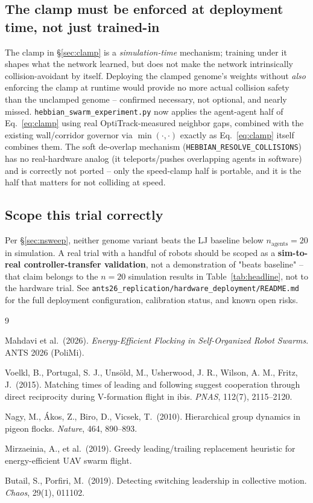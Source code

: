 \documentclass[11pt]{article}
\begin{document}
\subsection{The clamp must be enforced at deployment time, not just trained-in}
\label{sec:clamp-deploy}
The clamp in \S\ref{sec:clamp} is a \emph{simulation-time} mechanism; training under it shapes
what the network learned, but does not make the network intrinsically collision-avoidant by
itself. Deploying the clamped genome's weights without \emph{also} enforcing the clamp at
runtime would provide no more actual collision safety than the unclamped genome -- confirmed
necessary, not optional, and nearly missed. \texttt{hebbian\_swarm\_experiment.py} now applies
the agent-agent half of Eq.~\ref{eq:clamp} using real OptiTrack-measured neighbor gaps,
combined with the existing wall/corridor governor via $\min(\cdot,\cdot)$ exactly as
Eq.~\ref{eq:clamp} itself combines them. The soft de-overlap mechanism
(\texttt{HEBBIAN\_RESOLVE\_COLLISIONS}) has no real-hardware analog (it teleports/pushes
overlapping agents in software) and is correctly not ported -- only the speed-clamp half is
portable, and it is the half that matters for not colliding at speed.

\subsection{Scope this trial correctly}
Per \S\ref{sec:nsweep}, neither genome variant beats the LJ baseline below $n_{\text{agents}}=20$
in simulation. A real trial with a handful of robots should be scoped as a
\textbf{sim-to-real controller-transfer validation}, not a demonstration of "beats baseline"
-- that claim belongs to the $n{=}20$ simulation results in Table~\ref{tab:headline}, not to
the hardware trial. See \texttt{ants26\_replication/hardware\_deployment/README.md} for the
full deployment configuration, calibration status, and known open risks.

\clearpage
\begin{thebibliography}{9}

Mahdavi et al.\ (2026). \emph{Energy-Efficient Flocking in Self-Organized Robot Swarms}. ANTS
2026 (PoliMi).

Voelkl, B., Portugal, S. J., Unsöld, M., Usherwood, J. R., Wilson, A. M., Fritz, J.\ (2015).
Matching times of leading and following suggest cooperation through direct reciprocity during
V-formation flight in ibis. \emph{PNAS}, 112(7), 2115--2120.

Nagy, M., Ákos, Z., Biro, D., Vicsek, T.\ (2010). Hierarchical group dynamics in pigeon flocks.
\emph{Nature}, 464, 890--893.

Mirzaeinia, A., et al.\ (2019). Greedy leading/trailing replacement heuristic for
energy-efficient UAV swarm flight.

Butail, S., Porfiri, M.\ (2019). Detecting switching leadership in collective motion.
\emph{Chaos}, 29(1), 011102.

\end{thebibliography}
\end{document}
